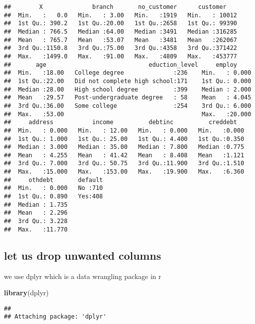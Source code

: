 \documentclass[]{article}
\newenvironment{Shaded}{\begin{snugshade}}{\end{snugshade}}
\newcommand{\KeywordTok}[1]{\textcolor[rgb]{0.13,0.29,0.53}{\textbf{#1}}}
\newcommand{\NormalTok}[1]{#1}
\begin{document}
\begin{verbatim}
##        X              branch       no_customer      customer     
##  Min.   :   0.0   Min.   : 3.00   Min.   :1919   Min.   : 10012  
##  1st Qu.: 390.2   1st Qu.:20.00   1st Qu.:2658   1st Qu.: 99390  
##  Median : 766.5   Median :64.00   Median :3491   Median :316285  
##  Mean   : 765.7   Mean   :53.07   Mean   :3481   Mean   :262067  
##  3rd Qu.:1150.8   3rd Qu.:75.00   3rd Qu.:4358   3rd Qu.:371422  
##  Max.   :1499.0   Max.   :91.00   Max.   :4809   Max.   :453777  
##       age                             eduction_level     employ      
##  Min.   :18.00   College degree              :236    Min.   : 0.000  
##  1st Qu.:22.00   Did not complete high school:171    1st Qu.: 0.000  
##  Median :28.00   High school degree          :399    Median : 2.000  
##  Mean   :29.57   Post-undergraduate degree   : 58    Mean   : 4.045  
##  3rd Qu.:36.00   Some college                :254    3rd Qu.: 6.000  
##  Max.   :53.00                                       Max.   :20.000  
##     address           income          debtinc          creddebt    
##  Min.   : 0.000   Min.   : 12.00   Min.   : 0.000   Min.   :0.000  
##  1st Qu.: 1.000   1st Qu.: 25.00   1st Qu.: 4.400   1st Qu.:0.350  
##  Median : 3.000   Median : 35.00   Median : 7.800   Median :0.775  
##  Mean   : 4.255   Mean   : 41.42   Mean   : 8.408   Mean   :1.121  
##  3rd Qu.: 7.000   3rd Qu.: 50.75   3rd Qu.:11.900   3rd Qu.:1.510  
##  Max.   :15.000   Max.   :153.00   Max.   :19.900   Max.   :6.360  
##     othdebt       default  
##  Min.   : 0.000   No :710  
##  1st Qu.: 0.890   Yes:408  
##  Median : 1.735            
##  Mean   : 2.296            
##  3rd Qu.: 3.228            
##  Max.   :11.770
\end{verbatim}

\hypertarget{let-us-drop-unwanted-columns}{%
\subsection{let us drop unwanted
columns}\label{let-us-drop-unwanted-columns}}

we use dplyr which is a data wrangling package in r

\begin{Shaded}
\begin{Highlighting}[]
\KeywordTok{library}\NormalTok{(dplyr)}
\end{Highlighting}
\end{Shaded}

\begin{verbatim}
## 
## Attaching package: 'dplyr'
\end{verbatim}
\end{document}
